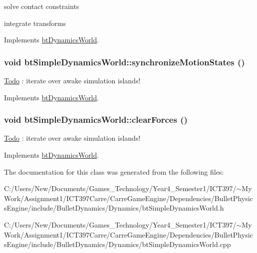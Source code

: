 solve contact constraints

integrate transforms 

Implements \hyperlink{classbt_dynamics_world_5ab26a0d6e8b2b21fbde2ed8f8dd6294}{btDynamicsWorld}.\hypertarget{classbt_simple_dynamics_world_91e996f5ce6e465e805565ee0ba14824}{
\subsubsection[synchronizeMotionStates]{\setlength{\rightskip}{0pt plus 5cm}void btSimpleDynamicsWorld::synchronizeMotionStates ()}}
\label{classbt_simple_dynamics_world_91e996f5ce6e465e805565ee0ba14824}




\begin{Desc}
\item[\hyperlink{todo__todo000034}{Todo}]: iterate over awake simulation islands! \end{Desc}


Implements \hyperlink{classbt_dynamics_world}{btDynamicsWorld}.\hypertarget{classbt_simple_dynamics_world_c44c80444f4d6d4e3c2955dd43b7a93a}{
\subsubsection[clearForces]{\setlength{\rightskip}{0pt plus 5cm}void btSimpleDynamicsWorld::clearForces ()}}
\label{classbt_simple_dynamics_world_c44c80444f4d6d4e3c2955dd43b7a93a}




\begin{Desc}
\item[\hyperlink{todo__todo000033}{Todo}]: iterate over awake simulation islands! \end{Desc}


Implements \hyperlink{classbt_dynamics_world}{btDynamicsWorld}.

The documentation for this class was generated from the following files:\begin{CompactItemize}
\item 
C:/Users/New/Documents/Games\_\-Technology/Year4\_\-Semester1/ICT397/$\sim$My Work/Assignment1/ICT397Carre/CarreGameEngine/Dependencies/BulletPhysicsEngine/include/BulletDynamics/Dynamics/btSimpleDynamicsWorld.h\item 
C:/Users/New/Documents/Games\_\-Technology/Year4\_\-Semester1/ICT397/$\sim$My Work/Assignment1/ICT397Carre/CarreGameEngine/Dependencies/BulletPhysicsEngine/include/BulletDynamics/Dynamics/btSimpleDynamicsWorld.cpp\end{CompactItemize}
